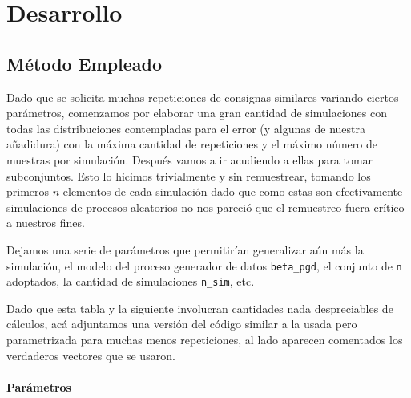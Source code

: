 \documentclass[]{article}
\let\oldparagraph\paragraph
\renewcommand{\paragraph}[1]{\oldparagraph{#1}\mbox{}}
\begin{document}
\hypertarget{desarrollo}{%
\section{Desarrollo}\label{desarrollo}}

\hypertarget{metodo-empleado}{%
\subsection{Método Empleado}\label{metodo-empleado}}

Dado que se solicita muchas repeticiones de consignas similares variando
ciertos parámetros, comenzamos por elaborar una gran cantidad de
simulaciones con todas las distribuciones contempladas para el error (y
algunas de nuestra añadidura) con la máxima cantidad de repeticiones y
el máximo número de muestras por simulación. Después vamos a ir
acudiendo a ellas para tomar subconjuntos. Esto lo hicimos trivialmente
y sin remuestrear, tomando los primeros \(n\) elementos de cada
simulación dado que como estas son efectivamente simulaciones de
procesos aleatorios no nos pareció que el remuestreo fuera crítico a
nuestros fines.

Dejamos una serie de parámetros que permitirían generalizar aún más la
simulación, el modelo del proceso generador de datos \texttt{beta\_pgd},
el conjunto de \texttt{n} adoptados, la cantidad de simulaciones
\texttt{n\_sim}, etc.

Dado que esta tabla y la siguiente involucran cantidades nada
despreciables de cálculos, acá adjuntamos una versión del código similar
a la usada pero parametrizada para muchas menos repeticiones, al lado
aparecen comentados los verdaderos vectores que se usaron.

\hypertarget{parametros}{%
\paragraph{Parámetros}\label{parametros}}
\end{document}
